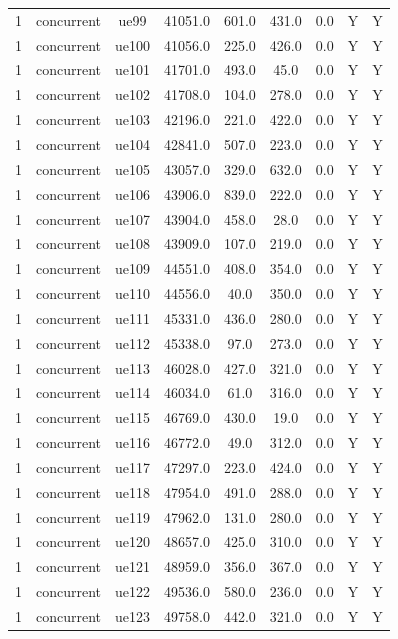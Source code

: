 \begin{table}[ht]
\begin{tabular}{|c|c|c|c|c|c|c|c|c|}
1 & concurrent & ue99 & 41051.0 & 601.0 & 431.0 & 0.0 & Y & Y \\
1 & concurrent & ue100 & 41056.0 & 225.0 & 426.0 & 0.0 & Y & Y \\
1 & concurrent & ue101 & 41701.0 & 493.0 & 45.0 & 0.0 & Y & Y \\
1 & concurrent & ue102 & 41708.0 & 104.0 & 278.0 & 0.0 & Y & Y \\
1 & concurrent & ue103 & 42196.0 & 221.0 & 422.0 & 0.0 & Y & Y \\
1 & concurrent & ue104 & 42841.0 & 507.0 & 223.0 & 0.0 & Y & Y \\
1 & concurrent & ue105 & 43057.0 & 329.0 & 632.0 & 0.0 & Y & Y \\
1 & concurrent & ue106 & 43906.0 & 839.0 & 222.0 & 0.0 & Y & Y \\
1 & concurrent & ue107 & 43904.0 & 458.0 & 28.0 & 0.0 & Y & Y \\
1 & concurrent & ue108 & 43909.0 & 107.0 & 219.0 & 0.0 & Y & Y \\
1 & concurrent & ue109 & 44551.0 & 408.0 & 354.0 & 0.0 & Y & Y \\
1 & concurrent & ue110 & 44556.0 & 40.0 & 350.0 & 0.0 & Y & Y \\
1 & concurrent & ue111 & 45331.0 & 436.0 & 280.0 & 0.0 & Y & Y \\
1 & concurrent & ue112 & 45338.0 & 97.0 & 273.0 & 0.0 & Y & Y \\
1 & concurrent & ue113 & 46028.0 & 427.0 & 321.0 & 0.0 & Y & Y \\
1 & concurrent & ue114 & 46034.0 & 61.0 & 316.0 & 0.0 & Y & Y \\
1 & concurrent & ue115 & 46769.0 & 430.0 & 19.0 & 0.0 & Y & Y \\
1 & concurrent & ue116 & 46772.0 & 49.0 & 312.0 & 0.0 & Y & Y \\
1 & concurrent & ue117 & 47297.0 & 223.0 & 424.0 & 0.0 & Y & Y \\
1 & concurrent & ue118 & 47954.0 & 491.0 & 288.0 & 0.0 & Y & Y \\
1 & concurrent & ue119 & 47962.0 & 131.0 & 280.0 & 0.0 & Y & Y \\
1 & concurrent & ue120 & 48657.0 & 425.0 & 310.0 & 0.0 & Y & Y \\
1 & concurrent & ue121 & 48959.0 & 356.0 & 367.0 & 0.0 & Y & Y \\
1 & concurrent & ue122 & 49536.0 & 580.0 & 236.0 & 0.0 & Y & Y \\
1 & concurrent & ue123 & 49758.0 & 442.0 & 321.0 & 0.0 & Y & Y \\

\end{tabular}
\end{table}
